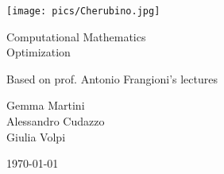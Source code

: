 \documentclass[computationalMathematics.tex]{subfiles}
\begin{document}
\begin{titlepage}
    \begin{center}
    \vspace{3cm}
    
    \Large
    
    \vspace{2cm}
    
    \texttt{[image: pics/Cherubino.jpg]}
    
    \vspace{2.5cm}
    
    {\Huge \sc Computational Mathematics\\ Optimization}
    
    \vspace{2cm}
    Based on prof. Antonio Frangioni's lectures
    
    \vspace{2cm}
    Gemma Martini\\ Alessandro Cudazzo\\ Giulia Volpi
    \vfill
    
    \today
    
    \end{center}
\end{titlepage}

\shipout\null

\tableofcontents
\let\tableofcontents\relax
\shipout\null

\newpage



\newpage



\newpage



\newpage



\newpage



\newpage



\newpage



\newpage



\newpage



\newpage
\end{document}
